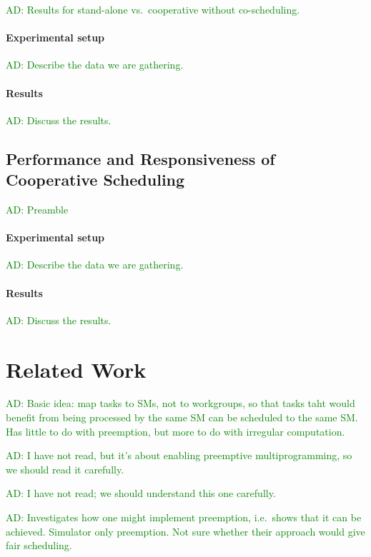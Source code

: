 \documentclass[nocopyrightspace,10pt]{sigplanconf}
\newcommand{\ADComment}[1]{\textcolor{green}{AD: #1}}
\begin{document}
\ADComment{Results for stand-alone vs.\ cooperative without co-scheduling.}

\paragraph{Experimental setup}  \ADComment{Describe the data we are gathering.}

\paragraph{Results}  \ADComment{Discuss the results.}

\subsection{Performance and Responsiveness of Cooperative Scheduling}

\ADComment{Preamble}

\paragraph{Experimental setup}  \ADComment{Describe the data we are gathering.}

\paragraph{Results}  \ADComment{Discuss the results.}



\section{Related Work}\label{sec:relatedwork}


\cite{DBLP:conf/ics/WuCLSV15} \ADComment{Basic idea: map tasks to
  SMs, not to workgroups, so that tasks taht would benefit from being
  processed by the same SM can be scheduled to the same SM.  Has
  little to do with preemption, but more to do with irregular
  computation.}

\cite{DBLP:conf/isca/TanasicGCRNV14} \ADComment{I have not read, but
  it's about enabling preemptive multiprogramming, so we should read
  it carefully.}

\cite{DBLP:conf/ppopp/Muyan-OzcelikO16} \ADComment{I have not read; we
  should understand this one carefully.}

\cite{DBLP:conf/asplos/ParkPM15} \ADComment{Investigates how one might
  implement preemption, i.e.\ shows that it can be achieved.
  Simulator only preemption.  Not sure whether their approach would
  give fair scheduling.}
\end{document}
